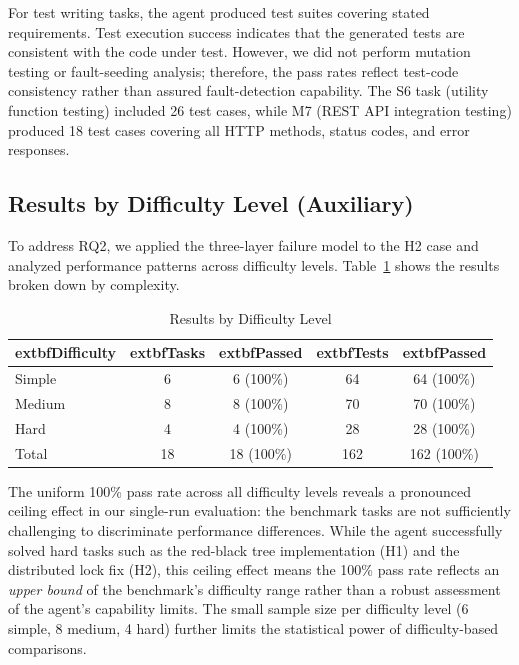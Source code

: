 \documentclass[conference]{IEEEtran}
\begin{document}
For test writing tasks, the agent produced test suites covering stated requirements. Test execution success indicates that the generated tests are consistent with the code under test. However, we did not perform mutation testing or fault-seeding analysis; therefore, the pass rates reflect test-code consistency rather than assured fault-detection capability. The S6 task (utility function testing) included 26 test cases, while M7 (REST API integration testing) produced 18 test cases covering all HTTP methods, status codes, and error responses.

\subsection{Results by Difficulty Level (Auxiliary)}

To address RQ2, we applied the three-layer failure model to the H2 case and analyzed performance patterns across difficulty levels. Table~\ref{tab:by_difficulty} shows the results broken down by complexity.

\begin{table}[h]
\centering
\caption{Results by Difficulty Level}
\label{tab:by_difficulty}
\small
\begin{tabular}{@{}lcccc@{}}
\toprule
			extbf{Difficulty} & 			extbf{Tasks} & 			extbf{Passed} & 			extbf{Tests} & 			extbf{Passed} \\
\midrule
Simple & 6 & 6 (100\%) & 64 & 64 (100\%) \\
Medium & 8 & 8 (100\%) & 70 & 70 (100\%) \\
Hard & 4 & 4 (100\%) & 28 & 28 (100\%) \\
\midrule
Total & 18 & 18 (100\%) & 162 & 162 (100\%) \\
\bottomrule
\end{tabular}
\end{table}

The uniform 100\% pass rate across all difficulty levels reveals a pronounced ceiling effect in our single-run evaluation: the benchmark tasks are not sufficiently challenging to discriminate performance differences. While the agent successfully solved hard tasks such as the red-black tree implementation (H1) and the distributed lock fix (H2), this ceiling effect means the 100\% pass rate reflects an \emph{upper bound} of the benchmark's difficulty range rather than a robust assessment of the agent's capability limits. The small sample size per difficulty level (6 simple, 8 medium, 4 hard) further limits the statistical power of difficulty-based comparisons.
\end{document}
